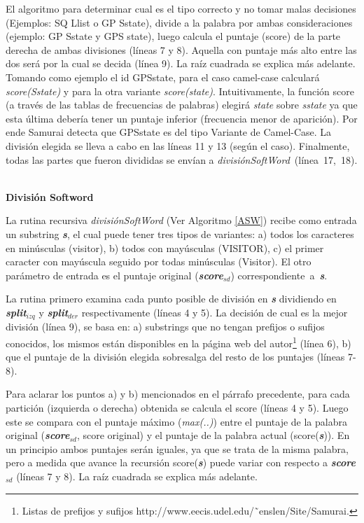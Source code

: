 El algoritmo para determinar cual es el tipo correcto y no tomar malas decisiones (Ejemplos: \textsf{SQ Llist} o \textsf{GP Sstate}), divide a la palabra por ambas consideraciones (ejemplo: \textsf{GP Sstate} y \textsf{GPS state}), luego calcula el puntaje (score) de la parte derecha de ambas divisiones (líneas 7 y 8). Aquella con puntaje más alto entre las dos será por la cual se decida (línea 9). La raíz cuadrada se explica más adelante. Tomando como ejemplo el id \mbox{\textsf{GPSstate}}, para el caso camel-case calculará \mbox{\textit{score(Sstate)}} y para la otra variante \textit{score(state)}. Intuitivamente, la función score (a través de las tablas de frecuencias de palabras) elegirá \textit{state} sobre \textit{sstate} ya que esta última debería tener un puntaje inferior (frecuencia menor de aparición). Por ende Samurai detecta que \mbox{\textsf{GPSstate}} es del tipo Variante de Camel-Case. La división elegida se lleva a cabo en las líneas 11 y 13 (según el caso).
Finalmente, todas las partes que fueron divididas se envían a \mbox{\textit{divisiónSoftWord} (línea 17, 18)}.

\noindent \textbf{\\División Softword\\}

La rutina recursiva \textit{divisiónSoftWord} (Ver Algoritmo \ref{ASW}) recibe como entrada un substring \textbf{\textit{s}}, el cual puede tener tres tipos de variantes: a) todos los caracteres en minúsculas (\textsf{visitor}), b) todos con mayúsculas (\textsf{VISITOR}), c) el primer caracter con mayúscula seguido por todas minúsculas (\textsf{Visitor}). El otro parámetro de entrada es el puntaje original (\textbf{\textit{score$_{sd}$}}) \mbox{correspondiente a \textbf{\textit{s}}}.

La rutina primero examina cada punto posible de división en \textbf{\textit{s}} dividiendo en \textbf{\textit{split$_{izq}$}} y \textbf{\textit{split$_{der}$}} respectivamente (líneas 4 y 5). La decisión de cual es la mejor división (línea 9), se basa en: a) substrings que no tengan prefijos o sufijos conocidos, los mismos están disponibles en la página web del autor\footnote[1]{Listas de prefijos y sufijos  http://www.eecis.udel.edu/˜enslen/Site/Samurai.} (línea 6), b) que el puntaje de la división elegida sobresalga del resto de los puntajes (líneas 7-8).

Para aclarar los puntos a) y b) mencionados en el párrafo precedente, para cada partición (izquierda o derecha) obtenida se calcula el score (líneas 4 y 5). Luego este se compara con el puntaje máximo (\textit{max(..)}) entre el puntaje de la palabra original (\textbf{\textit{score$_{sd}$}}, score original) y el puntaje de la palabra actual (score(\textbf{\textit{s}})). En un principio ambos puntajes serán iguales, ya que se trata de la misma palabra, pero a medida que avance la recursión score(\textbf{\textit{s}}) puede variar con respecto a \textbf{\textit{score$_{sd}$}} (líneas 7 y 8). La raíz cuadrada se explica más adelante.


